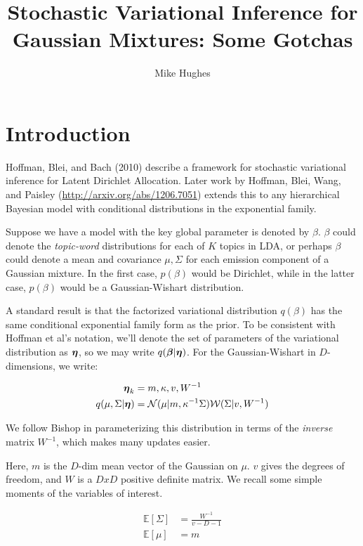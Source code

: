 \documentclass{article}
\title{Stochastic Variational Inference for Gaussian Mixtures: Some Gotchas}
\author{Mike Hughes}
\newcommand{\BF}[1]{\mbox{\boldmath$#1$}}
\begin{document}
\maketitle

\section{Introduction}
Hoffman, Blei, and Bach (2010) describe a framework for stochastic variational inference for Latent Dirichlet Allocation.  Later work by Hoffman, Blei, Wang, and Paisley (\url{http://arxiv.org/abs/1206.7051}) extends this to any hierarchical Bayesian model with conditional distributions in the exponential family.

Suppose we have a model with the key global parameter is denoted by $\beta$.  $\beta$ could denote the \emph{topic-word} distributions for each of $K$ topics in LDA, or perhaps $\beta$ could denote a mean and covariance $\mu,\Sigma$ for each emission component of a Gaussian mixture.  In the first case, $p(\beta)$ would be Dirichlet, while in the latter case, $p(\beta)$ would be a Gaussian-Wishart distribution.

A standard result is that the factorized variational distribution $q(\beta)$ has the same conditional exponential family form as the prior.  To be consistent with Hoffman et al's notation, we'll denote the set of parameters of the variational distribution as $\BF{\eta}$, so we may write $q(\BF{\beta} | \BF{\eta} )$.   For the Gaussian-Wishart in $D$-dimensions, we write:

\begin{align}
\BF{\eta}_k &= m, \kappa, v, W^{-1} \\
q( \mu, \Sigma | \BF{\eta} ) &= \mathcal{N}( \mu | m,  \kappa^{-1} \Sigma )  \mathcal{W}( \Sigma | v, W^{-1} )
\end{align}

We follow Bishop in parameterizing this distribution in terms of the \emph{inverse} matrix $W^{-1}$, which makes many updates easier.

Here, $m$ is the $D$-dim mean vector of the Gaussian on $\mu$.   $v$ gives the degrees of freedom, and $W$ is a $DxD$ positive definite matrix.   We recall some simple moments of the variables of interest.

\begin{align}
\mathbb{E}[  \Sigma ] &= \frac{W^{-1}}{ v - D - 1} \\
\mathbb{E}[ \mu ] &= m
\end{align}
\end{document}
